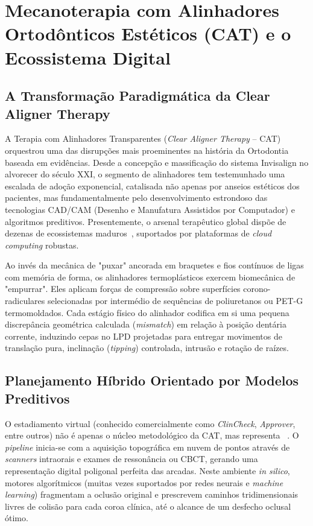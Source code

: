 \section{Mecanoterapia com Alinhadores Ortodônticos Estéticos (CAT) e o Ecossistema Digital}

\subsection{A Transformação Paradigmática da Clear Aligner Therapy}

A Terapia com Alinhadores Transparentes (\textit{Clear Aligner Therapy} -- CAT) orquestrou uma das disrupções mais proeminentes na história da Ortodontia baseada em evidências. Desde a concepção e massificação do sistema Invisalign no alvorecer do século XXI, o segmento de alinhadores tem testemunhado uma escalada de adoção exponencial, catalisada não apenas por anseios estéticos dos pacientes, mas fundamentalmente pelo desenvolvimento estrondoso das tecnologias CAD/CAM (Desenho e Manufatura Assistidos por Computador) e algoritmos preditivos. Presentemente, o arsenal terapêutico global dispõe de dezenas de ecossistemas maduros~\cite{olawade2026advancing}, suportados por plataformas de \textit{cloud computing} robustas.

Ao invés da mecânica de "puxar" ancorada em braquetes e fios contínuos de ligas com memória de forma, os alinhadores termoplásticos exercem biomecânica de "empurrar". Eles aplicam forças de compressão sobre superfícies corono-radiculares selecionadas por intermédio de sequências de poliuretanos ou PET-G termomoldados. Cada estágio físico do alinhador codifica em si uma pequena discrepância geométrica calculada (\textit{mismatch}) em relação à posição dentária corrente, induzindo cepas no LPD projetadas para entregar movimentos de translação pura, inclinação (\textit{tipping}) controlada, intrusão e rotação de raízes.

\subsection{Planejamento Híbrido Orientado por Modelos Preditivos}

O estadiamento virtual (conhecido comercialmente como \textit{ClinCheck}, \textit{Approver}, entre outros) não é apenas o núcleo metodológico da CAT, mas representa ~\cite{olawade2026advancing}. O \textit{pipeline} inicia-se com a aquisição topográfica em nuvem de pontos através de \textit{scanners} intraorais e exames de ressonância ou CBCT, gerando uma representação digital poligonal perfeita das arcadas. Neste ambiente \textit{in silico}, motores algorítmicos (muitas vezes suportados por redes neurais e \textit{machine learning}) fragmentam a oclusão original e prescrevem caminhos tridimensionais livres de colisão para cada coroa clínica, até o alcance de um desfecho oclusal ótimo.

